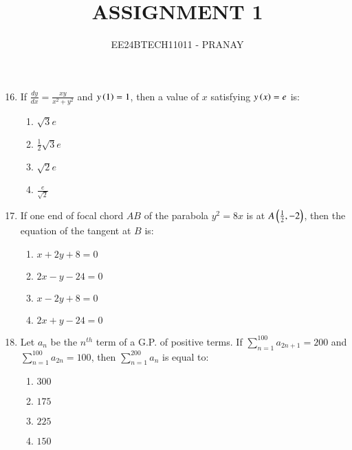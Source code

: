 \documentclass[journal,12pt,onecolumn]{IEEEtran}
\theoremstyle{remark}
\begin{document}

\vspace{3cm}

\title{ASSIGNMENT 1}
\author{EE24BTECH11011 - PRANAY}
\maketitle

\bigskip

\renewcommand{\thefigure}{\theenumi}
\renewcommand{\thetable}{\theenumi}

\begin{enumerate} \setcounter{enumi}{15}

    \item If $\frac{dy}{dx} = \frac{xy}{x^2+y^2}$ and $y\left(1\right)=1$, then a value of $x$ satisfying $y\left(x\right)=e$ is:
    \begin{multicols}{2} %
    \begin{enumerate}
        \item $\sqrt{3} e$\\
        \item $\frac{1}{2} \sqrt{3} e$\\
        \item $\sqrt{2}e$\\
        \item $\frac{e}{\sqrt{2}}$
    \end{enumerate}
    \end{multicols}

    \item If one end of focal chord $AB$ of the parabola $y^2 = 8x$ is at $A\left(\frac{1}{2},-2\right)$, then the equation of the tangent at $B$ is:
    \begin{multicols}{2}
    \begin{enumerate}
        \item $x+2y+8=0$
        \item $2x-y-24=0$
        \item $x-2y+8=0$
        \item $2x+y-24=0$
    \end{enumerate}
    \end{multicols}

    \item Let $a_n$ be the $n^{th}$ term of a G.P. of positive terms. If $\sum_{n=1}^{100} a_{2n+1} = 200$ and $\sum_{n=1}^{100}a_{2n} = 100$, then $\sum_{n=1}^{200}a_n$ is equal to:
    \begin{multicols}{2}
    \begin{enumerate}
        \item $300$\\
        \item $175$
        \item $225$\\
        \item $150$
    \end{enumerate}
    \end{multicols}


\end{enumerate}
\end{document}
